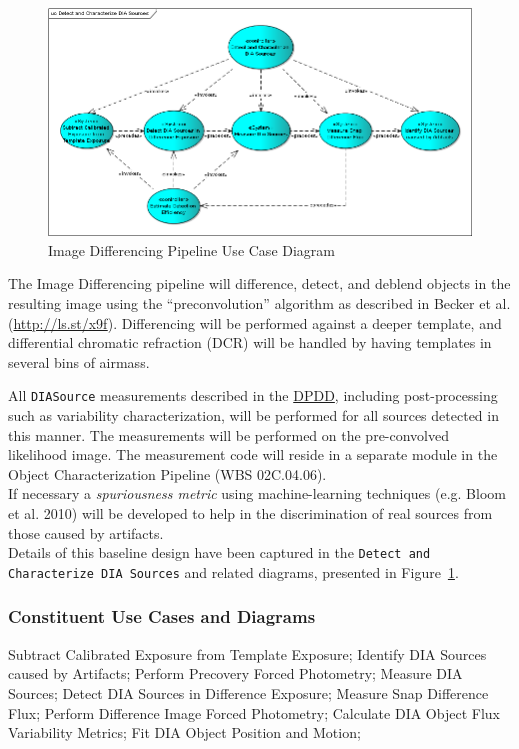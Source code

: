 \documentclass[12pt]{article}
\newcommand{\code}[1]{\texttt{#1}}
\newcommand{\DIASource}{\code{DIASource}\xspace}
\newcommand{\ds}[2]{{\color{blue} \href{https://docushare.lsstcorp.org/docushare/dsweb/Get/#1}{#2}}\xspace}
\newcommand{\DPDD}{\ds{LSE-163}{DPDD}}
\newcommand{\wbsObjChar}{WBS 02C.04.06}
\newcommand{\uc}[1]{{\tt #1}}
\begin{document}
\begin{figure}
\includegraphics[angle=0,scale=0.44]{detect_and_characterize_dia_sources.png}
\caption{Image Differencing Pipeline Use Case Diagram\label{fig:diffimUML}}
\end{figure}

The Image Differencing pipeline will difference, detect, and deblend objects in the resulting image using the ``preconvolution'' algorithm as described in Becker et al. (\url{http://ls.st/x9f}).
Differencing will be performed against a deeper template, and differential chromatic refraction (DCR) will be handled by having templates in several bins of airmass.

All \DIASource measurements described in the \DPDD, including post-processing such as variability characterization, will be performed for all sources detected in this manner. The measurements will be performed on the pre-convolved likelihood image. The measurement code will reside in a separate module in the Object Characterization Pipeline (\wbsObjChar).
\\

If necessary a {\em spuriousness metric} using machine-learning techniques (e.g. Bloom et al. 2010) will be developed to help in the discrimination of real sources from those caused by artifacts.
\\

Details of this baseline design have been captured in the \uc{Detect and Characterize DIA Sources} and related diagrams, presented in Figure~\ref{fig:diffimUML}.

\subsubsection{Constituent Use Cases and Diagrams}

Subtract Calibrated Exposure from Template Exposure;
Identify DIA Sources caused by Artifacts;
Perform Precovery Forced Photometry;
Measure DIA Sources;
Detect DIA Sources in Difference Exposure;
Measure Snap Difference Flux;
Perform Difference Image Forced Photometry;
Calculate DIA Object Flux Variability Metrics;
Fit DIA Object Position and Motion;
\end{document}
